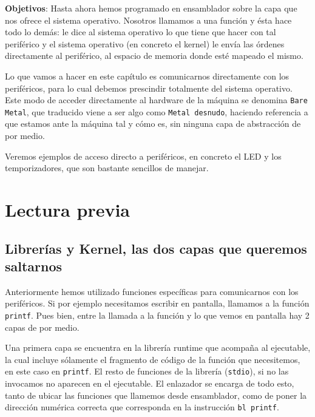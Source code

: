 

\label{chp:Subrut}
\minitoc

{\bf Objetivos}: Hasta ahora hemos programado en ensamblador sobre
la capa que nos ofrece el sistema operativo. Nosotros llamamos a una
función y ésta hace todo lo demás: le dice al sistema operativo lo
que tiene que hacer con tal periférico y el sistema operativo (en concreto
el kernel) le envía las órdenes directamente al periférico, al espacio
de memoria donde esté mapeado el mismo.

Lo que vamos a hacer en este capítulo es comunicarnos directamente con los
periféricos, para lo cual debemos prescindir totalmente del sistema operativo.
Este modo de acceder directamente al hardware de la máquina se denomina {\tt Bare Metal},
que traducido viene a ser algo como {\tt Metal desnudo}, haciendo referencia a
que estamos ante la máquina tal y cómo es, sin ninguna capa de abstracción de
por medio.

Veremos ejemplos de acceso directo a periféricos, en concreto el LED y los temporizadores,
que son bastante sencillos de manejar.


\section{Lectura previa}

\subsection{Librerías y Kernel, las dos capas que queremos saltarnos}

Anteriormente hemos utilizado funciones específicas para
comunicarnos con los periféricos. Si por ejemplo necesitamos escribir
en pantalla, llamamos a la función {\tt printf}. Pues bien, entre
la llamada a la función y lo que vemos en pantalla hay 2 capas de por medio.

Una primera capa se encuentra en la librería runtime que acompaña al
ejecutable, la cual incluye sólamente el fragmento de código de la
función que necesitemos, en este caso en {\tt printf}. El resto de
funciones de la librería ({\tt stdio}), si no las invocamos no aparecen
en el ejecutable. El enlazador se encarga de todo esto, tanto de ubicar
las funciones que llamemos desde ensamblador, como de poner la dirección
numérica correcta que corresponda en la instrucción {\tt bl printf}.

